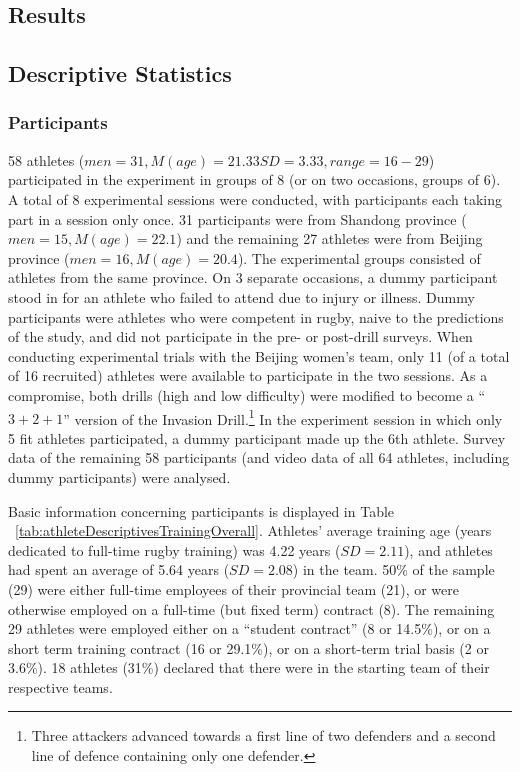 \begin{CJK}{UTF8}{gbsn}
\clearpage
\section{Results}


\subsection{Descriptive Statistics \label{sec:descriptives}}

\subsubsection{Participants}
58 athletes ($men = 31, M(age) = 21.33 SD = 3.33, range = 16-29$) participated in the experiment in groups of 8 (or on two occasions, groups of 6).  A total of 8 experimental sessions were conducted, with participants each taking part in a session only once.  31 participants were from Shandong province ($men = 15, M(age) = 22.1$) and the remaining 27 athletes were from Beijing province ($men = 16, M(age) = 20.4$).  The experimental groups consisted of athletes from the same province. On 3 separate occasions, a dummy participant stood in for an athlete who failed to attend due to injury or illness.  Dummy participants were athletes who were competent in rugby, naive to the predictions of the study, and did not participate in the pre- or post-drill surveys. When conducting experimental trials with the Beijing women's team, only 11 (of a total of 16 recruited) athletes were available to participate in the two sessions.  As a compromise, both drills (high and low difficulty) were modified to become a ``$3+2+1$'' version of the Invasion Drill.\footnote{Three attackers advanced towards a first line of two defenders and a second line of defence containing only one defender.} In the experiment session in which only 5 fit athletes participated, a dummy participant made up the 6th athlete.  Survey data of the remaining 58 participants (and video data of all 64 athletes, including dummy participants) were analysed.



Basic information concerning participants is displayed in Table ~\ref{tab:athleteDescriptivesTrainingOverall}.  Athletes' average training age (years dedicated to full-time rugby training) was 4.22 years ($SD = 2.11$), and athletes had spent an average of 5.64 years ($SD = 2.08$) in the team.  50\% of the sample (29) were either full-time employees of their provincial team (21), or were otherwise employed on a full-time (but fixed term) contract (8).  The remaining 29 athletes were employed either on a ``student contract'' (8 or 14.5\%), or on a short term training contract (16 or 29.1\%), or on a short-term trial basis (2 or 3.6\%).  18 athletes (31\%) declared that there were in the starting team of their respective teams.


\end{CJK}

